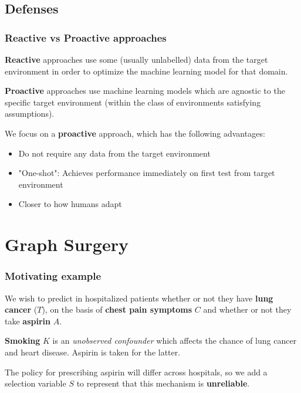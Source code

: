 \documentclass{beamer}
\begin{document}
\subsection{Defenses}
\begin{frame}
\frametitle{Reactive vs Proactive approaches}
\textbf{Reactive} approaches use some (usually unlabelled) data from the target environment in order to optimize the machine learning model for that domain.

\medskip
\textbf{Proactive} approaches use machine learning models which are agnostic to the specific target environment (within the class of environments satisfying assumptions).

\medskip
We focus on a \textbf{proactive} approach, which has the following advantages:
\begin{itemize}
	\item Do not require any data from the target environment
	\item "One-shot": Achieves performance immediately on first test from target environment
	\item Closer to how humans adapt
\end{itemize}
\end{frame}

\section{Graph Surgery}
\begin{frame}
\frametitle{Motivating example}
\begin{center}
\end{center}

We wish to predict in hospitalized patients whether or not they have \textbf{lung cancer} ($T$), on the basis of \textbf{chest pain symptoms} $C$ and whether or not they take \textbf{aspirin} $A$. 

\smallskip
\textbf{Smoking} $K$ is an \textit{unobserved confounder} which affects the chance of lung cancer and heart disease. Aspirin is taken for the latter.

\smallskip
The policy for prescribing aspirin will differ across hospitals, so we add a selection variable $S$ to represent that this mechanism is \textbf{unreliable}.
\end{frame}
\end{document}
